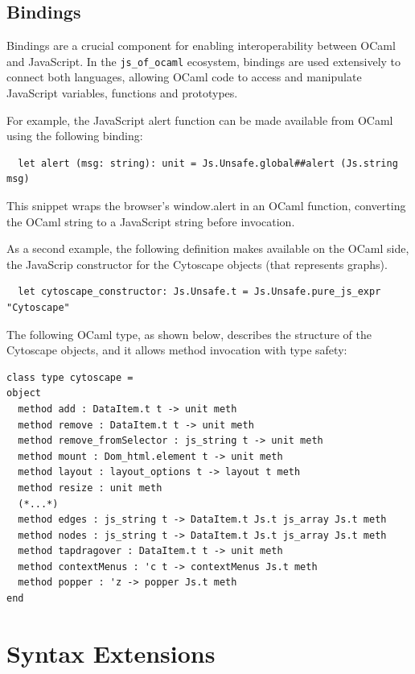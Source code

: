 \subsection{Bindings}
Bindings are a crucial component for enabling interoperability between OCaml and JavaScript. 
In the \texttt{js\_of\_ocaml} ecosystem, bindings are used extensively to connect both languages, 
allowing OCaml code to access and manipulate JavaScript variables, functions and prototypes.

For example, the JavaScript alert function can be made available from OCaml using the following binding:
\begin{verbatim}
  let alert (msg: string): unit = Js.Unsafe.global##alert (Js.string msg)
\end{verbatim}

This snippet wraps the browser's window.alert in an OCaml function, converting the
OCaml string to a JavaScript string before invocation.

As a second example, the following definition makes available on the OCaml side, the JavaScrip constructor for the Cytoscape objects (that represents graphs).

\begin{verbatim}
  let cytoscape_constructor: Js.Unsafe.t = Js.Unsafe.pure_js_expr "Cytoscape"
\end{verbatim}

The following OCaml type, as shown below, describes the structure of the Cytoscape objects, and it allows method invocation with type safety:

\begin{verbatim}
class type cytoscape =
object
  method add : DataItem.t t -> unit meth
  method remove : DataItem.t t -> unit meth
  method remove_fromSelector : js_string t -> unit meth
  method mount : Dom_html.element t -> unit meth
  method layout : layout_options t -> layout t meth
  method resize : unit meth
  (*...*)
  method edges : js_string t -> DataItem.t Js.t js_array Js.t meth
  method nodes : js_string t -> DataItem.t Js.t js_array Js.t meth
  method tapdragover : DataItem.t t -> unit meth
  method contextMenus : 'c t -> contextMenus Js.t meth
  method popper : 'z -> popper Js.t meth
end
\end{verbatim}

\section*{Syntax Extensions}


